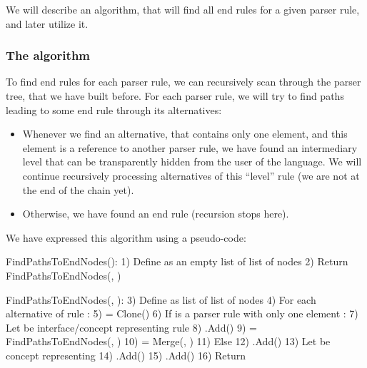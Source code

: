 We will describe an algorithm, that will find all end rules for a given parser rule, and later utilize it.

\subsubsection{The algorithm}
To find end rules for each parser rule, we can recursively scan through the parser tree, that we have built before.
For each parser rule, we will try to find paths leading to some end rule through its alternatives:

\begin{itemize}
	\item Whenever we find an alternative, that contains only one element, and this element is a reference to another parser rule, we have found an intermediary level that can be transparently hidden from the user of the language.
	We will continue recursively processing alternatives of this “level” rule (we are not at the end of the chain yet).

	\item Otherwise, we have found an end rule (recursion stops here).
\end{itemize}

We have expressed this algorithm using a pseudo-code:

\label{chap:shortcut_algorithm}
\begin{antlr}
	FindPathsToEndNodes():
	1)  Define  as an empty list of list of nodes
	2)  Return FindPathsToEndNodes(, )

	FindPathsToEndNodes(, ):
	3)  Define  as list of list of nodes
	4)  For each alternative  of rule :
	5)       = Clone()
	6)      If  is a parser rule with only one element :
	7)          Let  be interface/concept representing rule 
	8)          .Add()
	9)           = FindPathsToEndNodes(, )
	10)           = Merge(, )
	11)      Else
	12)          .Add()
	13)          Let  be concept representing 
	14)          .Add()
	15)          .Add()
	16)  Return 
\end{antlr}

